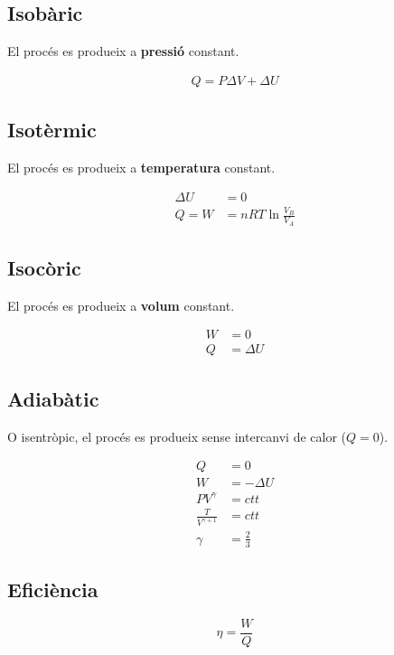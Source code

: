 \subsection{Isobàric}
\label{sub:isobaric}
El procés es produeix a \textbf{pressió} constant.

\begin{align}
    Q = P \Delta V + \Delta U
\end{align}

\subsection{Isotèrmic}
\label{sub:isotermic}
El procés es produeix a \textbf{temperatura} constant.

\begin{align}
    \Delta U &= 0\\
    Q = W &= nRT\ln\frac{V_B}{V_A}
\end{align}

\subsection{Isocòric}
\label{sub:isocoric}
El procés es produeix a \textbf{volum} constant.

\begin{align}
    W &= 0\\
    Q &= \Delta U
\end{align}

\pagebreak

\subsection{Adiabàtic}
\label{sub:adiabatic}
O isentròpic, el procés es produeix sense intercanvi de calor ($Q=0$).

\begin{align}
    Q &= 0\nonumber\\
    W &= -\Delta U \\
    PV^\gamma &= ctt \\
    \frac{T}{V^{\gamma + 1}} &= ctt \\
    \gamma &= \frac{2}{3} \nonumber
\end{align}

\subsection{Eficiència}
\label{sub:eficiencia}

\begin{equation}
    \eta = \frac{W}{Q}
\end{equation}


